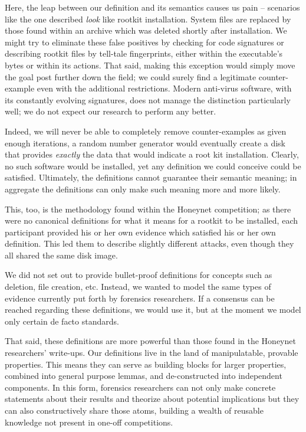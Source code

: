 \documentclass[nocopyrightspace,preprint]{sigplanconf}
\begin{document}
Here, the leap between our definition and its semantics causes us pain --
scenarios like the one described {\em look} like rootkit installation. System
files are replaced by those found within an archive which was deleted shortly
after installation. We might try to eliminate these false positives by
checking for code signatures or describing rootkit files by tell-tale
fingerprints, either within the executable's bytes or within its actions. That
said, making this exception would simply move the goal post further down the
field; we could surely find a legitimate counter-example even with the
additional restrictions. Modern anti-virus software, with its constantly
evolving signatures, does not manage the distinction particularly well; we do
not expect our research to perform any better.

Indeed, we will never be able to completely remove counter-examples as given
enough iterations, a random number generator would eventually create a disk
that provides {\em exactly} the data that would indicate a root kit
installation. Clearly, no such software would be installed, yet any definition
we could conceive could be satisfied. Ultimately, the definitions cannot
guarantee their semantic meaning; in aggregate the definitions can only make
such meaning more and more likely.

This, too, is the methodology found within the Honeynet competition; as there
were no canonical definitions for what it means for a rootkit to be installed,
each participant provided his or her own evidence which satisfied his or her
own definition. This led them to describe slightly different attacks, even
though they all shared the same disk image.

We did not set out to provide bullet-proof definitions for concepts such as
deletion, file creation, etc. Instead, we wanted to model the same types of
evidence currently put forth by forensics researchers. If a consensus can be
reached regarding these definitions, we would use it, but at the moment we
model only certain de facto standards.

That said, these definitions are more powerful than those found in the
Honeynet researchers' write-ups. Our definitions live in the land of
manipulatable, provable properties. This means they can serve as building
blocks for larger properties, combined into general purpose lemmas, and
de-constructed into independent components. In this form, forensics
researchers can not only make concrete statements about their results and
theorize about potential implications but they can also constructively share
those atoms, building a wealth of reusable knowledge not present in one-off
competitions.
\end{document}
